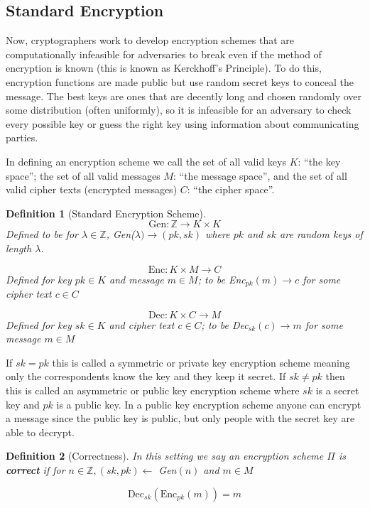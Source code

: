 \documentclass[12pt,twoside]{reedthesis}
\newtheorem{definition}{Definition}
\begin{document}
    \subsection{Standard Encryption}
    Now, cryptographers work to develop encryption schemes that are computationally infeasible for adversaries to break even if the method of encryption is known (this is known as Kerckhoff's Principle). To do this, encryption functions are made public but use random secret keys to conceal the message. The best keys are ones that are decently long and chosen randomly over some distribution (often uniformly), so it is infeasible for an adversary to check every possible key or guess the right key using information about communicating parties.
       \par In defining an encryption scheme we call the set of all valid keys $K$: ``the key space''; the set of all valid messages $M$: ``the message space'', and the set of all valid cipher texts (encrypted messages) $C$: ``the cipher space''.

\begin{definition}[Standard Encryption Scheme]
     
 
 $$\text{Gen}:\mathbb{Z} \rightarrow K \times K$$
 Defined to be for $\lambda \in \mathbb{Z}$, Gen($\lambda ) \rightarrow (pk,sk)$ where $pk$ and $sk$ are random keys of length $\lambda$.
 
  $$\text{Enc}:K \times M \rightarrow C$$
Defined for key $pk\in K$ and message $m\in M$; to be Enc$_{pk}(m) \rightarrow c$ for some cipher text $c\in C$
 
 $$\text{Dec}:K \times C \rightarrow M$$
 Defined for key $sk \in K$ and cipher text $c\in C$; to be Dec$_{sk}(c) \rightarrow m$ for some message $m\in M$
 
 \end{definition}
 
 
\par If $sk = pk$ this is called a symmetric or private key encryption scheme meaning only the correspondents know the key and they keep it secret. If $sk \not= pk$ then this is called an asymmetric or public key encryption scheme where $sk$ is a secret key and $pk$ is a public key. In a public key encryption scheme anyone can encrypt a message since the public key is public, but only people with the secret key are able to decrypt.


\begin{definition}[Correctness]
In this setting we say an encryption scheme $\Pi$ is \textbf{correct} if for $n\in \mathbb{Z} , (sk,pk) \leftarrow$ Gen$(n)$ and $m\in M$ 

$$\text{Dec}_{sk}(\text{Enc}_{pk}(m)) = m$$
\end{definition}
\end{document}
